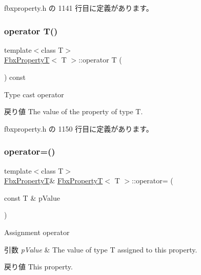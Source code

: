  fbxproperty.\+h の 1141 行目に定義があります。

\mbox{\label{class_fbx_property_t_aa4794cefd88b587963f0021c1ec32835}} 
\subsubsection{\texorpdfstring{operator T()}{operator T()}}
{\footnotesize\ttfamily template$<$class T$>$ \\
\hyperlink{class_fbx_property_t}{Fbx\+PropertyT}$<$ T $>$\+::operator T (\begin{DoxyParamCaption}{ }\end{DoxyParamCaption}) const\hspace{0.3cm}{\ttfamily [inline]}}

Type cast operator \begin{DoxyReturn}{戻り値}
The value of the property of type T. 
\end{DoxyReturn}


 fbxproperty.\+h の 1150 行目に定義があります。

\mbox{\label{class_fbx_property_t_a6334bf20dd8536b5a275c9cfabfa1a67}} 
\subsubsection{\texorpdfstring{operator=()}{operator=()}}
{\footnotesize\ttfamily template$<$class T$>$ \\
\hyperlink{class_fbx_property_t}{Fbx\+PropertyT}\& \hyperlink{class_fbx_property_t}{Fbx\+PropertyT}$<$ T $>$\+::operator= (\begin{DoxyParamCaption}\item[{const T \&}]{p\+Value }\end{DoxyParamCaption})\hspace{0.3cm}{\ttfamily [inline]}}

Assignment operator 
\begin{DoxyParams}{引数}
{\em p\+Value} & The value of type T assigned to this property. \\
\hline
\end{DoxyParams}
\begin{DoxyReturn}{戻り値}
This property. 
\end{DoxyReturn}


